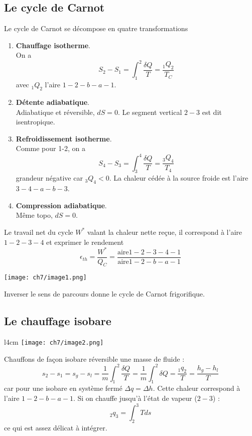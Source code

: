 		\subsection{Le cycle de Carnot}
		Le cycle de Carnot se décompose en quatre transformations
		\begin{enumerate}
		\item \textbf{Chauffage isotherme}.\\
		On a 
		\begin{equation}
		S_2-S_1 = \int_1^2 \dfrac{\delta Q}{T} = \dfrac{_1Q_2}{T_C}
		\end{equation}
		avec $_1Q_2$ l'aire $1-2-b-a-1$.
		\item \textbf{Détente adiabatique}.\\
		Adiabatique et réversible, $dS=0$. Le segment vertical $2-3$ est dit 
		isentropique.
		\item \textbf{Refroidissement isotherme}.\\
		Comme pour 1-2, on a
		\begin{equation}
		S_4-S_3 = \int_3^4 \dfrac{\delta Q}{T} = \dfrac{_3Q_4}{T_4}
		\end{equation}		
		grandeur négative car $_3Q_4<0$. La chaleur cédée à la source froide est 
		l'aire $3-4-a-b-3$.
		\item \textbf{Compression adiabatique}.\\
		Même topo, $dS=0$.
		\end{enumerate}
		Le travail net du cycle $W^*$ valant la chaleur nette reçue, il correspond 
		à l'aire $1-2-3-4$ et exprimer le rendement 
		\begin{equation}
		\epsilon_{th} = \dfrac{W^*}{Q_C} = \frac{\text{aire} 1-2-3-4-1}{\text{aire} 
		1-2-b-a-1}
		\end{equation}
			\begin{center}
	\texttt{[image: ch7/image1.png]}
	\end{center}
		Inverser le sens de parcours donne le cycle de Carnot frigorifique.
		
		\subsection{Le chauffage isobare}
		\begin{wrapfigure}[10]{l}{4cm}
		\vspace{-5mm}
		\texttt{[image: ch7/image2.png]}
		\end{wrapfigure}
		Chauffons de façon isobare réversible une masse de fluide  :
		\begin{equation}
		s_2-s_1 = s_g-s_l = \dfrac{1}{m}\int_1^2 \dfrac{\delta Q}{T} = \dfrac{1}{m}
		\int_1^2 \delta Q = \dfrac{_1q_2}{T} = \dfrac{h_g-h_l}{T}
		\end{equation}
		car pour une isobare en système fermé $\Delta q = \Delta h$. Cette chaleur 
		correspond à l'aire $1-2-b-a-1$. Si on chauffe jusqu'à l'état de vapeur ($2-3$) :
		\begin{equation}
		_2q_3 = \int_2^3 Tds
		\end{equation}
		ce qui est assez délicat à intégrer.
	
